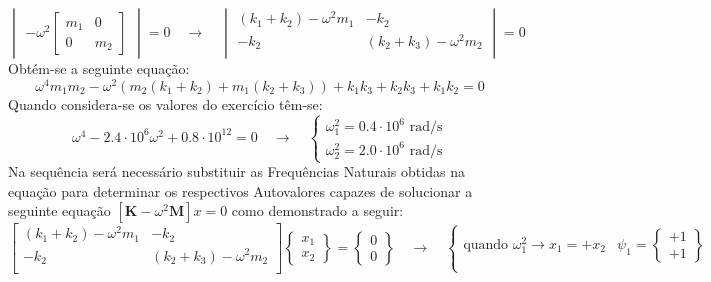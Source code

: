 \documentclass{article}
\begin{document}
\begin{resolution}
\begin{equation*}
\begin{vmatrix}
            -\omega^2 \begin{bmatrix} m_1 & 0\\ 0 & m_2\end{bmatrix}
        \end{vmatrix} = 0
        \quad\to\quad
        \begin{vmatrix}
            (k_1 + k_2) - \omega^2 m_1 & -k_2\\
            -k_2 & (k_2 + k_3) - \omega^2 m_2\\
        \end{vmatrix} = 0
    \end{equation*}
    Obtém-se a seguinte equação:
    \begin{equation*}
        \omega^4 m_1 m_2 - \omega^2 (m_2(k_1 + k_2) + m_1(k_2 + k_3)) + k_1 k_3 + k_2 k_3 + k_1 k_2 = 0
    \end{equation*}
    Quando considera-se os valores do exercício têm-se:
    \begin{equation*}
        \omega^4 - 2.4\cdot 10^{6} \omega^2 + 0.8\cdot 10^{12} = 0
        \quad \to \quad
        \begin{cases}
            \omega_1^2 = 0.4\cdot 10^{6}\text{ rad/s}\\
            \omega_2^2 = 2.0\cdot 10^{6}\text{ rad/s}
        \end{cases}
    \end{equation*}
    Na sequência será necessário substituir as Frequências Naturais obtidas na equação para determinar os respectivos Autovalores capazes de solucionar a seguinte equação $[\mathbf{K} - \omega^2\mathbf{M}]{x} = {0}$ como demonstrado a seguir:
    \begin{equation*}
        \begin{bmatrix} (k_1 + k_2) - \omega^2 m_1 & -k_2\\ -k_2 & (k_2 + k_3) - \omega^2 m_2\\\end{bmatrix} 
        \begin{Bmatrix} x_1 \\ x_2\end{Bmatrix} =
        \begin{Bmatrix} 0 \\ 0\end{Bmatrix}
        \quad \to \quad
        \begin{cases}
            \text{quando } \omega_1^2 \to x_1 = +x_2 & \psi_1 = \begin{Bmatrix} +1\\ +1\end{Bmatrix}\\

\end{cases}
\end{equation*}
\end{resolution}
\end{document}
